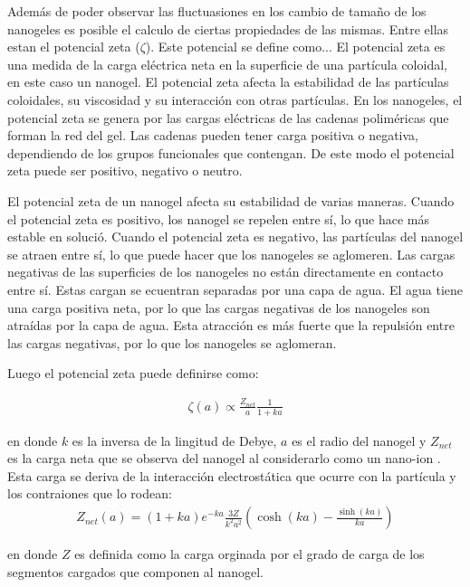 Adem\'as de poder observar las fluctuasiones en los cambio de tamaño de los nanogeles es posible el calculo de ciertas propiedades de las mismas. Entre ellas estan el potencial zeta ($\zeta$).
Este potencial se define como...
El potencial zeta es una medida de la carga el\'ectrica neta en la superficie de una part\'icula coloidal, en este caso un nanogel. El potencial zeta afecta la estabilidad de las part\'iculas coloidales, su viscosidad y su interacci\'on con otras part\'iculas.
En los nanogeles, el potencial zeta se genera por las cargas el\'ectricas de las cadenas polim\'ericas que forman la red del gel. Las cadenas  pueden tener carga positiva o negativa, dependiendo de los grupos funcionales que contengan. De este modo el potencial zeta puede ser positivo, negativo o neutro.

El potencial zeta de un nanogel afecta su estabilidad de varias maneras. Cuando el potencial zeta es positivo, los nanogel se repelen entre s\'i, lo que hace m\'as estable en soluci\'o. Cuando el potencial zeta es negativo, las part\'iculas del nanogel se atraen entre s\'i, lo que puede hacer que los nanogeles se aglomeren.
Las cargas negativas de las superficies de los nanogeles no est\'an directamente en contacto entre s\'i. Estas cargan se ecuentran  separadas por una capa de agua. El agua tiene una carga positiva neta, por lo que las cargas negativas de los nanogeles son atra\'idas por la capa de agua. Esta atracci\'on es m\'as fuerte que la repulsi\'on entre las cargas negativas, por lo que los nanogeles se aglomeran.

Luego el potencial zeta puede definirse como: \addcite[libro S\&C]

\begin{align}
	\zeta (a) \propto \frac{Z_{net}}{a} \frac{1}{1 +ka}
	\label{eq:mc:potzeta}
\end{align}


\noindent en donde  $k$ es la inversa de la lingitud de Debye, $a$ es el radio del nanogel y $Z_{net}$ es la carga neta que se observa del nanogel al considerarlo como un nano-ion \addcite[Denton 2003]. Esta carga se deriva de la interacci\'on electrost\'atica que ocurre con la part\'icula y los contraiones que lo rodean:
\begin{align}
	Z_{net}(a) = (1 + ka)e^{-ka} \frac{3Z}{k^2a^2}\left(\cosh(ka) - \frac{\sinh(ka)}{ka}\right)
	\label{eq:mc:znet}
\end{align}

\noindent en donde $Z$ es definida como la carga orginada por el grado de carga de los segmentos cargados que componen al nanogel.

